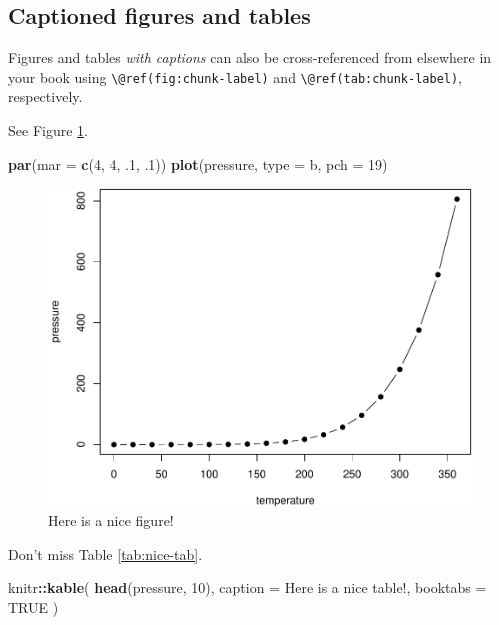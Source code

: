 \documentclass[
]{book}
\newenvironment{Shaded}{\begin{snugshade}}{\end{snugshade}}
\newcommand{\AttributeTok}[1]{\textcolor[rgb]{0.13,0.29,0.53}{#1}}
\newcommand{\ConstantTok}[1]{\textcolor[rgb]{0.56,0.35,0.01}{#1}}
\newcommand{\DecValTok}[1]{\textcolor[rgb]{0.00,0.00,0.81}{#1}}
\newcommand{\FunctionTok}[1]{\textcolor[rgb]{0.13,0.29,0.53}{\textbf{#1}}}
\newcommand{\NormalTok}[1]{#1}
\newcommand{\SpecialCharTok}[1]{\textcolor[rgb]{0.81,0.36,0.00}{\textbf{#1}}}
\newcommand{\StringTok}[1]{\textcolor[rgb]{0.31,0.60,0.02}{#1}}
\theoremstyle{definition}
\theoremstyle{definition}
\theoremstyle{definition}
\theoremstyle{definition}
\theoremstyle{remark}
\begin{document}
\hypertarget{captioned-figures-and-tables}{%
\subsection{Captioned figures and tables}\label{captioned-figures-and-tables}}

Figures and tables \emph{with captions} can also be cross-referenced from elsewhere in your book using \texttt{\textbackslash{}@ref(fig:chunk-label)} and \texttt{\textbackslash{}@ref(tab:chunk-label)}, respectively.

See Figure \ref{fig:nice-fig}.

\begin{Shaded}
\begin{Highlighting}[]
\FunctionTok{par}\NormalTok{(}\AttributeTok{mar =} \FunctionTok{c}\NormalTok{(}\DecValTok{4}\NormalTok{, }\DecValTok{4}\NormalTok{, .}\DecValTok{1}\NormalTok{, .}\DecValTok{1}\NormalTok{))}
\FunctionTok{plot}\NormalTok{(pressure, }\AttributeTok{type =} \StringTok{\textquotesingle{}b\textquotesingle{}}\NormalTok{, }\AttributeTok{pch =} \DecValTok{19}\NormalTok{)}
\end{Highlighting}
\end{Shaded}

\begin{figure}

{\centering \includegraphics[width=0.8\linewidth]{202401280000-minimal-book-example_files/figure-latex/nice-fig-1} 

}

\caption{Here is a nice figure!}\label{fig:nice-fig}
\end{figure}

Don't miss Table \ref{tab:nice-tab}.

\begin{Shaded}
\begin{Highlighting}[]
\NormalTok{knitr}\SpecialCharTok{::}\FunctionTok{kable}\NormalTok{(}
  \FunctionTok{head}\NormalTok{(pressure, }\DecValTok{10}\NormalTok{), }\AttributeTok{caption =} \StringTok{\textquotesingle{}Here is a nice table!\textquotesingle{}}\NormalTok{,}
  \AttributeTok{booktabs =} \ConstantTok{TRUE}
\NormalTok{)}
\end{Highlighting}
\end{Shaded}
\end{document}
